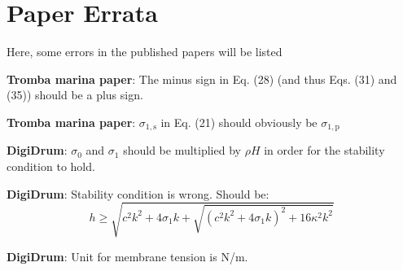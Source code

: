 \chapter{Paper Errata}
Here, some errors in the published papers will be listed

\textbf{Tromba marina paper}: The minus sign in Eq. (28) (and thus Eqs. (31) and (35)) should be a plus sign.

\textbf{Tromba marina paper}: $\sigma_{1,\text{s}}$ in Eq. (21) should obviously be $\sigma_{1,\text{p}}$

\textbf{DigiDrum}: $\sigma_0$ and $\sigma_1$ should be multiplied by $\rho H$ in order for the stability condition to hold.

\textbf{DigiDrum}: Stability condition is wrong. Should be: 
\begin{equation}
    h \geq \sqrt{c^2k^2 + 4\sigma_1k + \sqrt{(c^2k^2+4\sigma_1k)^2 + 16\kappa^2k^2}}
\end{equation}

\textbf{DigiDrum}: Unit for membrane tension is N/m.